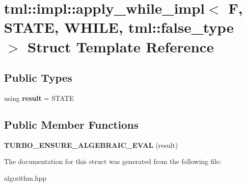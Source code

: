 \hypertarget{structtml_1_1impl_1_1apply__while__impl_3_01F_00_01STATE_00_01WHILE_00_01tml_1_1false__type_01_4}{\section{tml\+:\+:impl\+:\+:apply\+\_\+while\+\_\+impl$<$ F, S\+T\+A\+T\+E, W\+H\+I\+L\+E, tml\+:\+:false\+\_\+type $>$ Struct Template Reference}
\label{structtml_1_1impl_1_1apply__while__impl_3_01F_00_01STATE_00_01WHILE_00_01tml_1_1false__type_01_4}
}
\subsection*{Public Types}
\begin{DoxyCompactItemize}
\item 
\hypertarget{structtml_1_1impl_1_1apply__while__impl_3_01F_00_01STATE_00_01WHILE_00_01tml_1_1false__type_01_4_a1f6c3024ca9471d4fa4baec2579ad2b6}{using {\bfseries result} = S\+T\+A\+T\+E}\label{structtml_1_1impl_1_1apply__while__impl_3_01F_00_01STATE_00_01WHILE_00_01tml_1_1false__type_01_4_a1f6c3024ca9471d4fa4baec2579ad2b6}

\end{DoxyCompactItemize}
\subsection*{Public Member Functions}
\begin{DoxyCompactItemize}
\item 
\hypertarget{structtml_1_1impl_1_1apply__while__impl_3_01F_00_01STATE_00_01WHILE_00_01tml_1_1false__type_01_4_a1d9e77a5b1b27dd4233f818a73831b34}{{\bfseries T\+U\+R\+B\+O\+\_\+\+E\+N\+S\+U\+R\+E\+\_\+\+A\+L\+G\+E\+B\+R\+A\+I\+C\+\_\+\+E\+V\+A\+L} (result)}\label{structtml_1_1impl_1_1apply__while__impl_3_01F_00_01STATE_00_01WHILE_00_01tml_1_1false__type_01_4_a1d9e77a5b1b27dd4233f818a73831b34}

\end{DoxyCompactItemize}


The documentation for this struct was generated from the following file\+:\begin{DoxyCompactItemize}
\item 
algorithm.\+hpp\end{DoxyCompactItemize}
